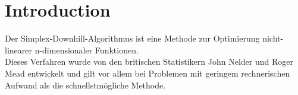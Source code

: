 \chapter{Introduction}
Der Simplex-Downhill-Algorithmus ist eine Methode zur Optimierung nicht-linearer n-dimensionaler Funktionen. \\
Dieses Verfahren wurde von den britischen Statistikern John Nelder und Roger Mead entwickelt und gilt vor allem bei Problemen mit 
geringem rechnerischen Aufwand als die schnellstmögliche Methode. 
